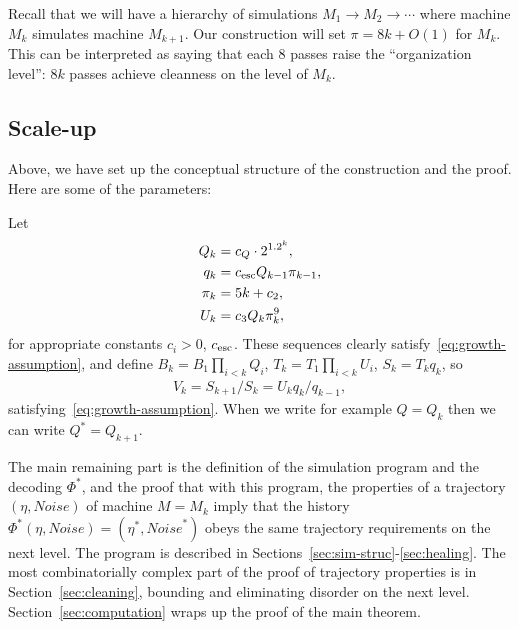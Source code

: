 \documentclass[11pt]{memoir}
\theoremstyle{definition} %
\def\B{B}
\def\U{U}
\def\V{V}
\newcommand{\escno}{q}
\newcommand{\Noise}{\mathit{Noise}}
\newcommand{\passno}{\pi}
\newcommand{\Q}{Q} %
\renewcommand{\S}{S} %
\newcommand{\Tu}{T}
\newcommand{\cns}[1]{c_{\textrm{\upshape #1}}}
\newcommand{\CEsc}{\cns{esc}}
\begin{document}
Recall that we will have a hierarchy of simulations \( M_{1}\to M_{2}\to \dotsm \) where
machine \( M_{k} \) simulates machine \( M_{k+1} \).
Our construction will set \( \passno=8k + O(1) \) for \( M_{k} \).
This can be interpreted as saying that each 8 passes raise the ``organization level'':
\( 8 k \) passes achieve cleanness on the level of \( M_{k} \).

\subsection{Scale-up}

Above, we have set up the conceptual structure of the construction and the proof.
Here are some of the parameters: 

\begin{definition}\label{def:hier-params}
  Let
  \begin{align*}
  \Q_{k}&=c_{\Q}\cdot 2^{1.2^{k}},
    \\   \escno_{k}&=\CEsc\Q_{k-1}\passno_{k-1},
    \\   \passno_{k}&=5 k + c_{2}, 
    \\   \U_{k} &= c_{3}\Q_{k}\passno_{k}^{9},
 \end{align*}
for appropriate constants \( c_{i}>0 \), \( \CEsc \).
 These sequences clearly satisfy~\eqref{eq:growth-assumption}, and
 define \( \B_{k}=\B_{1}\prod_{i<k}\Q_{i} \), 
 \( \Tu_{k}=\Tu_{1}\prod_{i<k}\U_{i} \), \( \S_{k} = \Tu_{k}\escno_{k} \),
 so
 \begin{align*}
   \V_{k} = \S_{k+1}/\S_{k} = \U_{k}\escno_{k}/\escno_{k-1},
 \end{align*}
 satisfying~\eqref{eq:growth-assumption}.
 When we write for example \( \Q=\Q_{k} \) then we can write \( \Q^{*}=\Q_{k+1} \).
\end{definition}

 The main remaining part is the definition of the simulation program and the decoding \( \Phi^{*} \),
and the proof that with this
program, the properties of a trajectory \( (\eta,\Noise) \) of machine \( M=M_{k} \) imply
that the history \( \Phi^{*}(\eta,\Noise)=(\eta^{*},\Noise^{*}) \) obeys the same trajectory
requirements on the next level.
The program is described in Sections~\ref{sec:sim-struc}-\ref{sec:healing}.
The most combinatorially complex part of the proof of trajectory properties
is in Section~\ref{sec:cleaning}, bounding and eliminating disorder on the next level.
Section~\ref{sec:computation} wraps up the proof of the main theorem.
\end{document}
